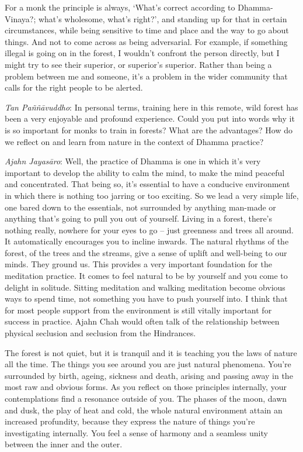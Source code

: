 For a monk the principle is always, `What's correct according to
Dhamma-Vinaya?; what's wholesome, what's right?', and standing up for
that in certain circumstances, while being sensitive to time and place
and the way to go about things. And not to come across as being
adversarial. For example, if something illegal is going on in the
forest, I wouldn't confront the person directly, but I might try to see
their superior, or superior's superior. Rather than being a problem
between me and someone, it's a problem in the wider community that calls
for the right people to be alerted. 

\emph{Tan Paññāvuddho}: In personal terms, training here in this
remote, wild forest has been a very enjoyable and profound experience. 
Could you put into words why it is so important for monks to train in
forests? What are the advantages? How do we reflect on and learn from
nature in the context of Dhamma practice? 

\emph{Ajahn Jayasāro}: Well, the practice of Dhamma is one in which
it's very important to develop the ability to calm the mind, to make the
mind peaceful and concentrated. That being so, it's essential to have a
conducive environment in which there is nothing too jarring or too
exciting. So we lead a very simple life, one bared down to the
essentials, not surrounded by anything man-made or anything that's going
to pull you out of yourself. Living in a forest, there's nothing really, 
nowhere for your eyes to go -- just greenness and trees all around. It
automatically encourages you to incline inwards. The natural rhythms of
the forest, of the trees and the streams, give a sense of uplift and
well-being to our minds. They ground us. This provides a very important
foundation for the meditation practice. It comes to feel natural to be
by yourself and you come to delight in solitude. Sitting meditation and
walking meditation become obvious ways to spend time, not something you
have to push yourself into. I think that for most people support from
the environment is still vitally important for success in practice. 
Ajahn Chah would often talk of the relationship between physical
seclusion and seclusion from the Hindrances. 

The forest is not quiet, but it is tranquil and it is teaching you the
laws of nature all the time. The things you see around you are just
natural phenomena. You're surrounded by birth, ageing, sickness and
death, arising and passing away in the most raw and obvious forms. As
you reflect on those principles internally, your contemplations find a
resonance outside of you. The phases of the moon, dawn and dusk, the
play of heat and cold, the whole natural environment attain an increased
profundity, because they express the nature of things you're
investigating internally. You feel a sense of harmony and a seamless
unity between the inner and the outer. 


